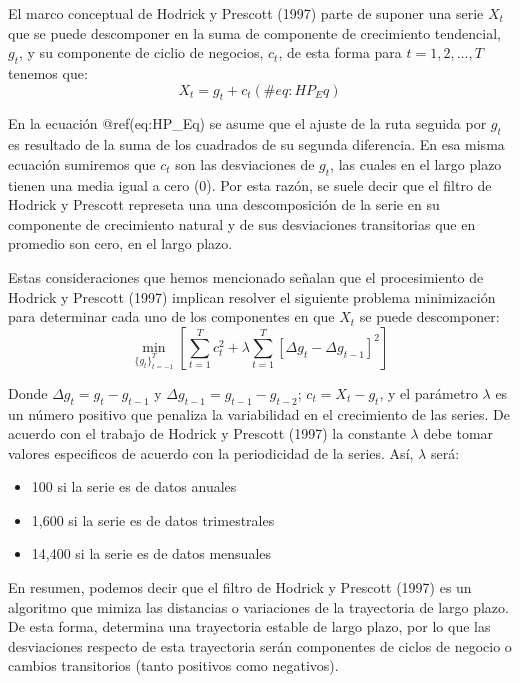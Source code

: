 \documentclass[
]{book}
\begin{document}
El marco conceptual de Hodrick y Prescott (1997) parte de suponer una serie \(X_t\) que se puede descomponer en la suma de componente de crecimiento tendencial, \(g_t\), y su componente de ciclio de negocios, \(c_t\), de esta forma para \(t = 1, 2, \ldots, T\) tenemos que:
\begin{equation}
    X_t = g_t + c_t
    (\#eq:HP_Eq)
\end{equation}

En la ecuación @ref(eq:HP\_Eq) se asume que el ajuste de la ruta seguida por \(g_t\) es resultado de la suma de los cuadrados de su segunda diferencia. En esa misma ecuación sumiremos que \(c_t\) son las desviaciones de \(g_t\), las cuales en el largo plazo tienen una media igual a cero (0). Por esta razón, se suele decir que el filtro de Hodrick y Prescott represeta una una descomposición de la serie en su componente de crecimiento natural y de sus desviaciones transitorias que en promedio son cero, en el largo plazo.

Estas consideraciones que hemos mencionado señalan que el procesimiento de Hodrick y Prescott (1997) implican resolver el siguiente problema minimización para determinar cada uno de los componentes en que \(X_t\) se puede descomponer:
\begin{equation}
    \min_{\{ g_t \}^T_{t = -1} } \left[ \sum^T_{t = 1} c^2_t + \lambda \sum^T_{t = 1} [ \Delta g_t - \Delta g_{t-1}]^2 \right]
\end{equation}

Donde \(\Delta g_t = g_t - g_{t-1}\) y \(\Delta g_{t-1} = g_{t-1} - g_{t-2}\); \(c_t = X_t - g_t\), y el parámetro \(\lambda\) es un número positivo que penaliza la variabilidad en el crecimiento de las series. De acuerdo con el trabajo de Hodrick y Prescott (1997) la constante \(\lambda\) debe tomar valores especificos de acuerdo con la periodicidad de la series. Así, \(\lambda\) será:

\begin{itemize}
    \item 100 si la serie es de datos anuales
    \item 1,600 si la serie es de datos trimestrales
    \item 14,400 si la serie es de datos mensuales
\end{itemize}

En resumen, podemos decir que el filtro de Hodrick y Prescott (1997) es un algoritmo que mimiza las distancias o variaciones de la trayectoria de largo plazo. De esta forma, determina una trayectoria estable de largo plazo, por lo que las desviaciones respecto de esta trayectoria serán componentes de ciclos de negocio o cambios transitorios (tanto positivos como negativos).
\end{document}
